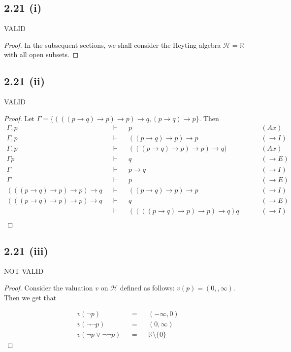 \documentclass[12pt]{article}
\begin{document}
\subsection*{2.21 (i)} VALID

\begin{proof}
In the subsequent sections, we shall consider the Heyting algebra $\mathcal{H} = \mathbb{R}$ with all open subsets. 
\end{proof}

\subsection*{2.21 (ii)} VALID
\begin{proof}
Let $\Gamma = \{(((p \rightarrow q) \rightarrow p) \rightarrow p) \rightarrow q, (p \rightarrow q) \rightarrow p\}$. Then 
\begin{align*}
    \Gamma, p &&\vdash&& p && &&(Ax)\\
    \Gamma, p &&\vdash&& ((p \rightarrow q) \rightarrow p) \rightarrow p && &&(\rightarrow I)\\
    \Gamma, p &&\vdash&& (((p \rightarrow q) \rightarrow p) \rightarrow p) \rightarrow q) && &&(Ax)\\
    \Gamma p &&\vdash&& q && &&(\rightarrow E) \\
    \Gamma &&\vdash&& p \rightarrow q && &&(\rightarrow I) \\
    \Gamma &&\vdash&& p && &&(\rightarrow E) \\
    (((p \rightarrow q) \rightarrow p) \rightarrow p) \rightarrow q &&\vdash&& ((p \rightarrow q) \rightarrow p) \rightarrow p && &&(\rightarrow I) \\
    (((p \rightarrow q) \rightarrow p) \rightarrow p) \rightarrow q &&\vdash&& q && &&(\rightarrow E) \\
    &&\vdash&& ((((p \rightarrow q) \rightarrow p) \rightarrow p) \rightarrow q) q && &&(\rightarrow I) \\
\end{align*}
\end{proof}

\subsection*{2.21 (iii)} NOT VALID

\begin{proof}
Consider the valuation $v$ on $\mathcal{H}$ defined as follows: $v(p) = (0,,\infty)$. Then we get that 

\begin{align*}
    v(\neg p) &&=&& (-\infty, 0) \\
    v(\neg \neg p) &&=&& (0, \infty) \\
    v(\neg p \vee \neg \neg p) &&=&& \mathbb{R} \setminus \{0\}
\end{align*}

\end{proof}
\end{document}
